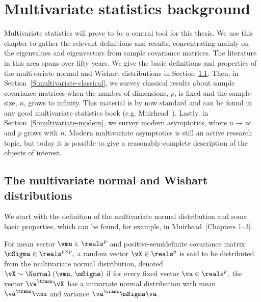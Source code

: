 
\chapter{Multivariate statistics background}\label{C:multivariate-background}

Multivariate statistics will prove to be a central tool for this thesis.  We use this chapter to gather the relevant definitions and results, concentrating mainly on the eigenvalues and eigenvectors from sample covariance matrices.  The literature in this area spans over fifty years.  We give the basic definitions and properties of the multivariate normal and Wishart distributions in Section~\ref{S:mulitivariate-definitions}.  Then, in Section~\ref{S:multivariate-classical}, we survey classical results about sample covariance matrices when the number of dimensions, $p$, is fixed and the sample size, $n$, grows to infinity.  This material is by now standard and can be found in any good multivariate statistics book (e.g. Muirhead~\cite{muirhead1982ams}).  Lastly,  in Section~\ref{S:multivariate-modern}, we survey modern asymptotics, where $n \to \infty$ and $p$ grows with $n$.  Modern multivariate asymptotics is still an active research topic, but today it is possible to give a reasonably-complete description of the objects of interest.

\section{The multivariate normal and Wishart distributions}\label{S:mulitivariate-definitions}

We start with the definition of the multivariate normal distribution and some basic properties, which can be found, for example, in Muirhead~\cite{muirhead1982ams}[Chapters 1--3].

\begin{definition}
    \label{D:multivariate-normal}
For mean vector 
\(
    \vmu \in \reals^p
\)
and positive-semidefinite covariance matrix
\(
    \mSigma \in \reals^{p\times p},
\)
a random vector 
\(
    \vX \in \reals^p
\)
is said to be distributed from the multivariate normal distribution, denoted 
\(
    \vX 
    \sim 
    \Normal \left(
        \vmu, \,
        \mSigma
    \right)
\)
if for every fixed vector $\va \in \reals^p$, the vector
$\va^\trans \vX$ has a univariate normal distribution with mean
\(
    \va^\trans \vmu
\)
and variance
\(
    \va^\trans \mSigma \va
\).
\end{definition}

